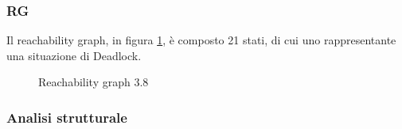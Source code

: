 \documentclass[a4paper]{article}
\begin{document}
\subsubsection{RG}
Il reachability graph, in figura \ref{FIG:3.8RG}, è composto 21 stati, di cui uno rappresentante una situazione di Deadlock.
\begin{figure}[!ht]
\centering
{}
\caption{Reachability graph 3.8} \label{FIG:3.8RG}
\end{figure}
\newpage
\subsubsection{Analisi strutturale}
\end{document}
